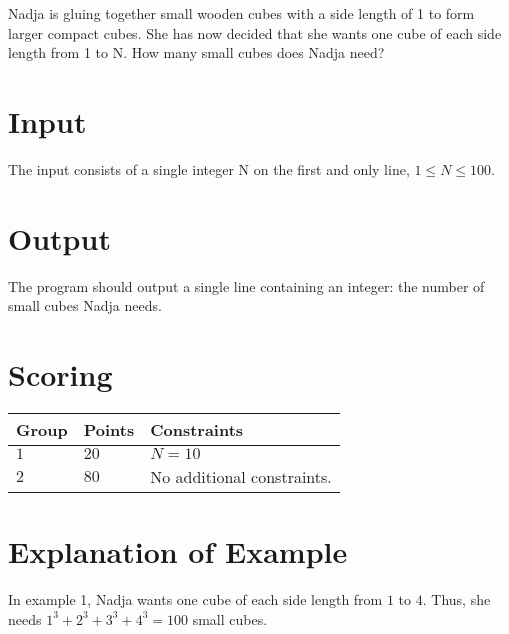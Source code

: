\noindent

%
Nadja is gluing together small wooden cubes with a side length of 1 to form larger compact cubes. 
She has now decided that she wants one cube of each side length from 1 to N. 
How many small cubes does Nadja need?

\section*{Input}
The input consists of a single integer N on the first and only line, $1 \leq N \leq 100$.

\section*{Output}
The program should output a single line containing an integer: the number of small cubes Nadja needs.

\section*{Scoring}
\noindent
\begin{tabular}{| l | l | p{12cm} |}
  \hline
  \textbf{Group} & \textbf{Points} & \textbf{Constraints} \\ \hline
  $1$    & $20$       & $N = 10$ \\ \hline
  $2$    & $80$       & No additional constraints. \\ \hline
\end{tabular}

\section*{Explanation of Example}
In example 1, Nadja wants one cube of each side length from $1$ to $4$.
Thus, she needs $1^3 + 2^3 + 3^3 + 4^3 = 100$ small cubes.